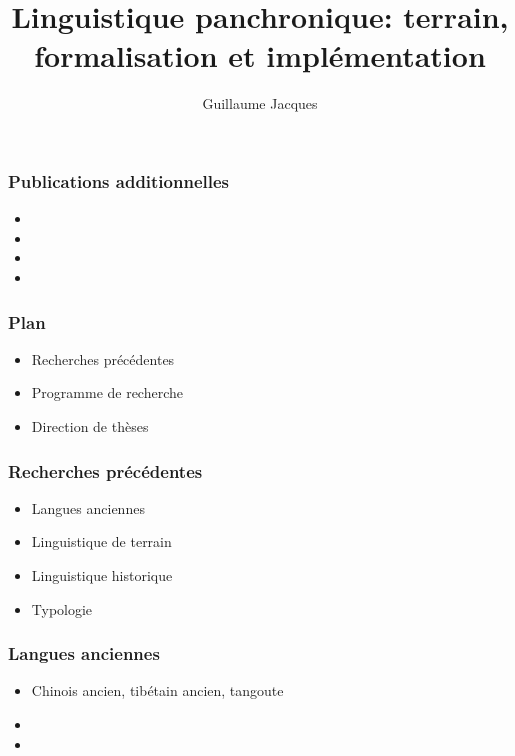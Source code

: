 \documentclass[xcolor=table]{beamer}
\begin{document}
 \title{Linguistique panchronique: terrain, formalisation et implémentation}
 \author{Guillaume Jacques}
 \date{}
 \maketitle


 \begin{frame} 
 \frametitle{Publications additionnelles}
 
   
\begin{itemize}
\item  {}  
\item  {}
\item  {}
\item  {}
\end{itemize}
 \end{frame}
 
    \begin{frame} 
 \frametitle{Plan} 
 
 \begin{itemize}
\item  Recherches précédentes
\item  Programme de recherche
\item  Direction de thèses
\end{itemize}
   \end{frame} 
 
 
   \begin{frame} 
 \frametitle{Recherches précédentes} 
 \begin{itemize}%
\item Langues anciennes
\item Linguistique de terrain 
\item Linguistique historique
\item Typologie
\end{itemize}
   \end{frame} 
   
   \begin{frame} 
 \frametitle{Langues anciennes} 
 \begin{itemize}%
\item Chinois ancien, tibétain ancien, tangoute
\item {}  
\item {}  
\end{itemize}
   \end{frame} 
   
\end{document}
